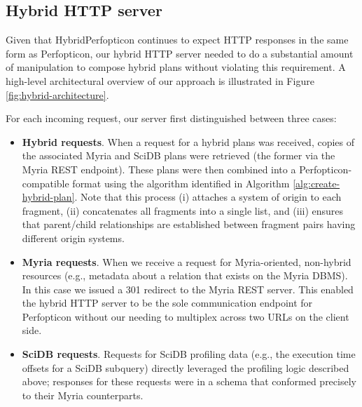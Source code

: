 \documentclass{chi2009}
\begin{document}
\subsection{Hybrid HTTP server}

Given that HybridPerfopticon continues to expect HTTP responses in the same form as Perfopticon, our hybrid HTTP server needed to do a substantial amount of manipulation to compose hybrid plans without violating this requirement.  A high-level architectural overview of our approach is illustrated in Figure \ref{fig:hybrid-architecture}.

For each incoming request, our server first distinguished between three cases:

\begin{itemize}
\item \textbf{Hybrid requests}.  When a request for a hybrid plans was received, copies of the associated Myria and SciDB plans were retrieved (the former via the Myria REST endpoint).  These plans were then combined into a Perfopticon-compatible format using the algorithm identified in Algorithm \ref{alg:create-hybrid-plan}.  Note that this process (i) attaches a system of origin to each fragment, (ii) concatenates all fragments into a single list, and (iii) ensures that parent/child relationships are established between fragment pairs having different origin systems.
\item \textbf{Myria requests}.  When we receive a request for Myria-oriented, non-hybrid resources (e.g., metadata about a relation that exists on the Myria DBMS).  In this case we issued a 301 redirect to the Myria REST server.  This enabled the hybrid HTTP server to be the sole communication endpoint for Perfopticon without our needing to multiplex across two URLs on the client side.
\item \textbf{SciDB requests}.  Requests for SciDB profiling data (e.g., the execution time offsets for a SciDB subquery) directly leveraged the profiling logic described above; responses for these requests were in a schema that conformed precisely to their Myria counterparts.
\end{itemize}
\end{document}
